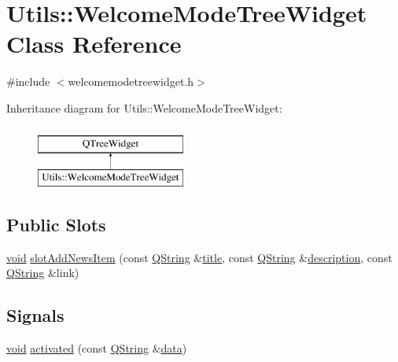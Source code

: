 \hypertarget{class_utils_1_1_welcome_mode_tree_widget}{\section{Utils\-:\-:Welcome\-Mode\-Tree\-Widget Class Reference}
\label{class_utils_1_1_welcome_mode_tree_widget}
}


{\ttfamily \#include $<$welcomemodetreewidget.\-h$>$}

Inheritance diagram for Utils\-:\-:Welcome\-Mode\-Tree\-Widget\-:\begin{figure}[H]
\begin{center}
\leavevmode
\includegraphics[height=2.000000cm]{class_utils_1_1_welcome_mode_tree_widget}
\end{center}
\end{figure}
\subsection*{Public Slots}
\begin{DoxyCompactItemize}
\item 
\hyperlink{group___u_a_v_objects_plugin_ga444cf2ff3f0ecbe028adce838d373f5c}{void} \hyperlink{class_utils_1_1_welcome_mode_tree_widget_ad3bfb5c7084907a7f3bcca9ba2569033}{slot\-Add\-News\-Item} (const \hyperlink{group___u_a_v_objects_plugin_gab9d252f49c333c94a72f97ce3105a32d}{Q\-String} \&\hyperlink{_parse_e_k_f_log_8m_a5df555a5fed35967e041e4abd1269b4e}{title}, const \hyperlink{group___u_a_v_objects_plugin_gab9d252f49c333c94a72f97ce3105a32d}{Q\-String} \&\hyperlink{sdlgamepad_8dox_ae82208d022e4246ddf1e4f481a3f81b0}{description}, const \hyperlink{group___u_a_v_objects_plugin_gab9d252f49c333c94a72f97ce3105a32d}{Q\-String} \&link)
\end{DoxyCompactItemize}
\subsection*{Signals}
\begin{DoxyCompactItemize}
\item 
\hyperlink{group___u_a_v_objects_plugin_ga444cf2ff3f0ecbe028adce838d373f5c}{void} \hyperlink{class_utils_1_1_welcome_mode_tree_widget_a6364bd06f202e06b8d1b023bd9df2526}{activated} (const \hyperlink{group___u_a_v_objects_plugin_gab9d252f49c333c94a72f97ce3105a32d}{Q\-String} \&\hyperlink{glext_8h_a8850df0785e6fbcc2351af3b686b8c7a}{data})
\end{DoxyCompactItemize}
